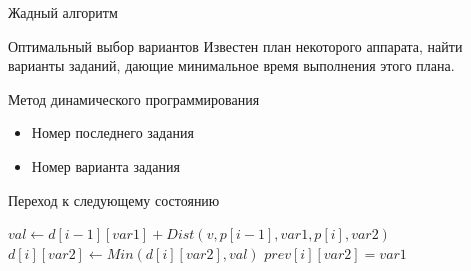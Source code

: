 \documentclass{beamer}
\begin{document}
\begin{frame}{Жадный алгоритм}

\end{frame}

\begin{frame}{Оптимальный выбор вариантов}
Известен план некоторого аппарата, найти варианты заданий, дающие минимальное время выполнения этого плана.

Метод динамического программирования
\begin{itemize}
\item Номер последнего задания
\item Номер варианта задания
\end{itemize}

\begin{exampleblock}{Переход к следующему состоянию}

\begin{algorithmic}
\State $val \gets d[i - 1][var1] + Dist(v, p[i - 1], var1, p[i], var2)$
    \State $d[i][var2] \gets Min(d[i][var2], val)$
    \State $prev[i][var2] = var1$
\EndIf
\end{algorithmic}

\end{exampleblock}

\end{frame}
\end{document}
